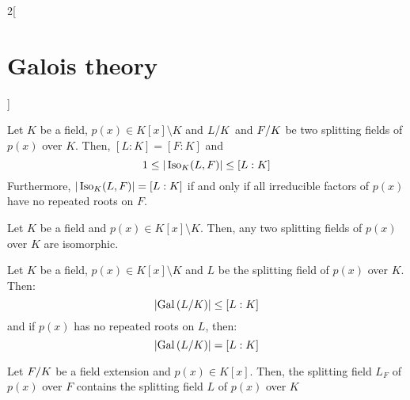 \documentclass[../../../main.tex]{subfiles}
\begin{document}
\begin{multicols}{2}[\section{Galois theory}]
\begin{theorem}
  \end{theorem}
  \begin{theorem}
    Let $K$ be a field, $p(x)\in K[x]\setminus K$ and $\quot{L}{K}$ and $\quot{F}{K}$ be two splitting fields of $p(x)$ over $K$. Then, $[L:K]=[F:K]$ and $$1\leq|\operatorname{Iso}_K(L,F)|\leq [L:K]$$ Furthermore, $|\operatorname{Iso}_K(L,F)|=[L:K]$ if and only if all irreducible factors of $p(x)$ have no repeated roots on $F$.
  \end{theorem}
  \begin{corollary}
    Let $K$ be a field and $p(x)\in K[x]\setminus K$. Then, any two splitting fields of $p(x)$ over $K$ are isomorphic.
  \end{corollary}
  \begin{corollary}
    Let $K$ be a field, $p(x)\in K[x]\setminus K$ and $L$ be the splitting field of $p(x)$ over $K$. Then: $$\textstyle\left|\Gal\left(\quot{L}{K}\right)\right|\leq[L:K]$$ and if $p(x)$ has no repeated roots on $L$, then: $$\textstyle\left|\Gal\left(\quot{L}{K}\right)\right|=[L:K]$$
  \end{corollary}
  \begin{corollary}
    Let $\quot{F}{K}$ be a field extension and $p(x)\in K[x]$. Then, the splitting field $L_F$ of $p(x)$ over $F$ contains the splitting field $L$ of $p(x)$ over $K$
  \end{corollary}

\end{multicols}
\end{document}
